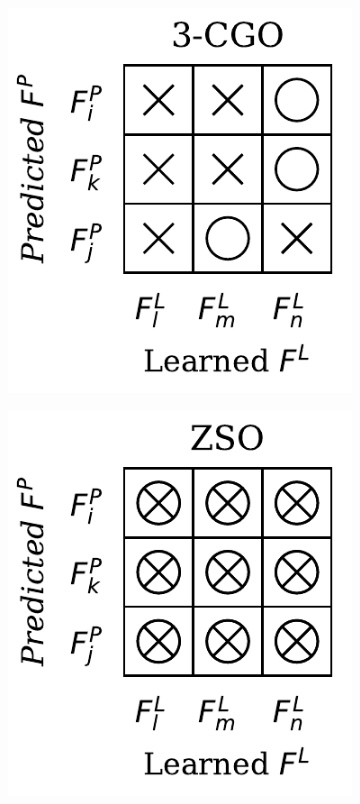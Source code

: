 \begin{definition}[SO/GO in DiagVib-6]
\begin{figure}[H]
\begin{subfigure}[b]{0.17\textwidth}
        \end{subfigure}
        \hfill
        \begin{subfigure}[b]{0.17\textwidth}
            \includegraphics[width=\textwidth]{img/datasets/_3-CGO.pdf}
        \end{subfigure}
        \hfill
        \begin{subfigure}[b]{0.17\textwidth}
            \includegraphics[width=\textwidth]{img/datasets/_ZSO.pdf}

\end{subfigure}
\end{figure}
\end{definition}
